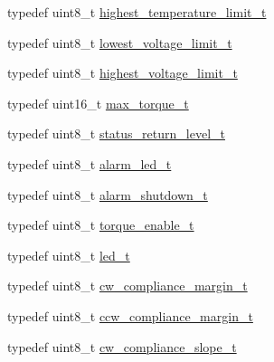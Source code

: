 \begin{DoxyCompactItemize}
\item 
typedef uint8\+\_\+t \hyperlink{structdynamixel_1_1servos_1_1_model_traits_3_01_ex106_01_4_1_1_c_t_acac4c76b00364da32c031be264b9c2ad}{highest\+\_\+temperature\+\_\+limit\+\_\+t}
\item 
typedef uint8\+\_\+t \hyperlink{structdynamixel_1_1servos_1_1_model_traits_3_01_ex106_01_4_1_1_c_t_a658e23da498355e3ffe4e5321e1bb411}{lowest\+\_\+voltage\+\_\+limit\+\_\+t}
\item 
typedef uint8\+\_\+t \hyperlink{structdynamixel_1_1servos_1_1_model_traits_3_01_ex106_01_4_1_1_c_t_a807879ecc28b22f92438427f7c7f58fb}{highest\+\_\+voltage\+\_\+limit\+\_\+t}
\item 
typedef uint16\+\_\+t \hyperlink{structdynamixel_1_1servos_1_1_model_traits_3_01_ex106_01_4_1_1_c_t_a636b107463425ecc0800b64d126ef797}{max\+\_\+torque\+\_\+t}
\item 
typedef uint8\+\_\+t \hyperlink{structdynamixel_1_1servos_1_1_model_traits_3_01_ex106_01_4_1_1_c_t_a1bb06e92b9d4a3c2d9025a6592719f4e}{status\+\_\+return\+\_\+level\+\_\+t}
\item 
typedef uint8\+\_\+t \hyperlink{structdynamixel_1_1servos_1_1_model_traits_3_01_ex106_01_4_1_1_c_t_aa7d5cdcf71c0a1a6c583cbb719b9d8b1}{alarm\+\_\+led\+\_\+t}
\item 
typedef uint8\+\_\+t \hyperlink{structdynamixel_1_1servos_1_1_model_traits_3_01_ex106_01_4_1_1_c_t_ad2ef83246416e16b0ddbd3de0c8e90fc}{alarm\+\_\+shutdown\+\_\+t}
\item 
typedef uint8\+\_\+t \hyperlink{structdynamixel_1_1servos_1_1_model_traits_3_01_ex106_01_4_1_1_c_t_a74af69745ca72204a2a177ca39033e39}{torque\+\_\+enable\+\_\+t}
\item 
typedef uint8\+\_\+t \hyperlink{structdynamixel_1_1servos_1_1_model_traits_3_01_ex106_01_4_1_1_c_t_a5e4eecfa6c26711d0c9b1ab7776f59f9}{led\+\_\+t}
\item 
typedef uint8\+\_\+t \hyperlink{structdynamixel_1_1servos_1_1_model_traits_3_01_ex106_01_4_1_1_c_t_a08b944cbbba36332ba8c85211669146f}{cw\+\_\+compliance\+\_\+margin\+\_\+t}
\item 
typedef uint8\+\_\+t \hyperlink{structdynamixel_1_1servos_1_1_model_traits_3_01_ex106_01_4_1_1_c_t_a83f29c01b2a7b66fb485a494e5c441ae}{ccw\+\_\+compliance\+\_\+margin\+\_\+t}
\item 
typedef uint8\+\_\+t \hyperlink{structdynamixel_1_1servos_1_1_model_traits_3_01_ex106_01_4_1_1_c_t_a75d5d3ae0fc5976e854017af52dbf09b}{cw\+\_\+compliance\+\_\+slope\+\_\+t}
\item 

\end{DoxyCompactItemize}
